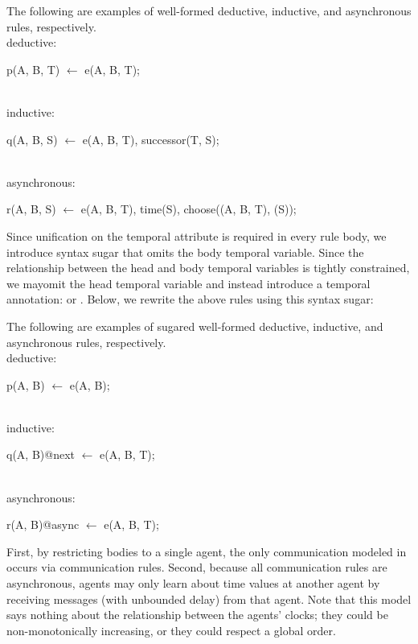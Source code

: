 \begin{example}
The following are examples of well-formed deductive, inductive, and asynchronous rules, respectively.
\\
deductive:
\begin{Dedalus}
p(A, B, T) \(\leftarrow\) e(A, B, T);
\end{Dedalus}
\\
inductive:
\begin{Dedalus}
q(A, B, S) \(\leftarrow\) e(A, B, T), successor(T, S);
\end{Dedalus}
\\
asynchronous:
\begin{Dedalus}
r(A, B, S) \(\leftarrow\) e(A, B, T), time(S), choose((A, B, T), (S));
\end{Dedalus}
\end{example}

Since unification on the temporal attribute is required in every rule body, we introduce syntax sugar that omits the body temporal variable.  Since the relationship between the head and body temporal variables is tightly constrained, we mayomit the head temporal variable and instead introduce a temporal annotation:  or .  Below, we rewrite the above rules using this syntax sugar:

\begin{example}
The following are examples of sugared well-formed deductive, inductive, and asynchronous rules, respectively.
\\
deductive:
\begin{Dedalus}
p(A, B) \(\leftarrow\) e(A, B);
\end{Dedalus}
\\
inductive:
\begin{Dedalus}
q(A, B)@next \(\leftarrow\) e(A, B, T);
\end{Dedalus}
\\
asynchronous:
\begin{Dedalus}
r(A, B)@async \(\leftarrow\) e(A, B, T);
\end{Dedalus}
\end{example}


First, by restricting bodies to a single agent, the only communication
modeled in \lang occurs via communication rules.  Second, because
all communication rules are asynchronous, agents may only learn about
time values at another agent by receiving messages (with unbounded
delay) from that agent.  Note that this model says nothing about the
relationship between the agents' clocks; they could be
non-monotonically increasing, or they could respect a global order.

